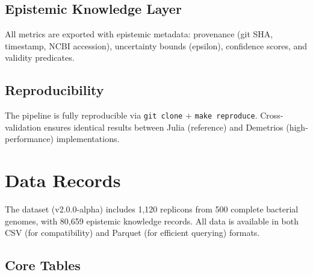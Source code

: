 \documentclass[12pt,a4paper]{article}
\begin{document}
\subsection{Epistemic Knowledge Layer}
All metrics are exported with epistemic metadata: provenance (git SHA, timestamp, NCBI accession), uncertainty bounds (epsilon), confidence scores, and validity predicates.

\subsection{Reproducibility}
The pipeline is fully reproducible via \texttt{git clone} + \texttt{make reproduce}. Cross-validation ensures identical results between Julia (reference) and Demetrios (high-performance) implementations.

\section{Data Records}

The dataset (v2.0.0-alpha) includes 1,120 replicons from 500 complete bacterial genomes, with 80,659 epistemic knowledge records. All data is available in both CSV (for compatibility) and Parquet (for efficient querying) formats.

\subsection{Core Tables}
\end{document}
